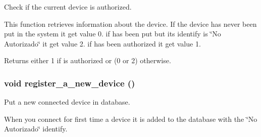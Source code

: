 Check if the current device is authorized. 

This function retrieves information about the device. If the device has never been put in the system it get value 0. if has been put but its identify is \char`\"{}No Autorizado\char`\"{} it get value 2. if has been authorized it get value 1. \begin{DoxyReturn}{Returns}
either 1 if is authorized or (0 or 2) otherwise. 
\end{DoxyReturn}
\hypertarget{usb-control_8h_a10395957994d66e936a4cb1e68fe47aa}{
\subsubsection[{register\_\-a\_\-new\_\-device}]{\setlength{\rightskip}{0pt plus 5cm}void register\_\-a\_\-new\_\-device ()}}
\label{usb-control_8h_a10395957994d66e936a4cb1e68fe47aa}


Put a new connected device in database. 

When you connect for first time a device it is added to the database with the \char`\"{}No Autorizado\char`\"{} identify. 